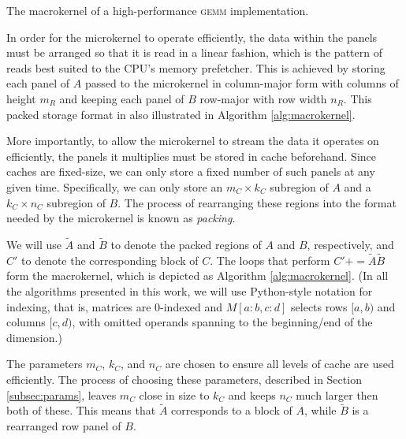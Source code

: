 \documentclass[12pt]{article}
\newcommand*{\TO}{\textbf{to}}
\newcommand*{\pluseq}{\mathrel{{+}{=}}}
\newcommand*{\gemm}{{\textsc{gemm}}}
\begin{document}
\begin{algorithm}
  \caption{The macrokernel of a high-performance \gemm{} implementation.}
  \label{alg:macrokernel}
  \begin{tikzpicture}
    
  \end{tikzpicture}
  \begin{algorithmic}
    \For{$j \gets 0, n_R, \ldots$ \TO{} $n_C$}
    \For{$i \gets 0, m_R, \ldots$ \TO{} $m_C$}
    \State{$C'[i:i + m_R, j:j + n_R] \pluseq \widetilde{A}[i:i+m_R,:] \cdot \widetilde{B}[:,j:j+n_R]$}
    \EndFor{}
    \EndFor{}
    \EndProcedure{}
  \end{algorithmic}
\end{algorithm}

In order for the microkernel to operate efficiently, the data within the panels must be arranged so that it is read in a linear fashion, which is the pattern of reads best suited to the CPU's memory prefetcher.
This is achieved by storing each panel of $A$ passed to the microkernel in column-major form with columns of height $m_R$ and keeping each panel of $B$ row-major with row width $n_R$.
This packed storage format in also illustrated in Algorithm \ref{alg:macrokernel}.

More importantly, to allow the microkernel to stream the data it operates on efficiently, the panels it multiplies must be stored in cache beforehand.
Since caches are fixed-size, we can only store a fixed number of such panels at any given time.
Specifically, we can only store an $m_C \times k_C$ subregion of $A$ and a $k_C \times n_C$ subregion of $B$.
The process of rearranging these regions into the format needed by the microkernel is known as \emph{packing}.

We will use $\widetilde{A}$ and $\widetilde{B}$ to denote the packed regions of $A$ and $B$, respectively, and $C'$ to denote the corresponding block of $C$.
The loops that perform $C' \pluseq \widetilde{A}\widetilde{B}$ form the macrokernel, which is depicted as Algorithm \ref{alg:macrokernel}.
(In all the algorithms presented in this work, we will use Python-style notation for indexing, that is, matrices are 0-indexed and   $M[a:b, c:d]$ selects rows $[a, b)$ and columns $[c, d)$, with omitted operands spanning to the beginning/end of the dimension.)

The parameters $m_C$, $k_C$, and $n_C$ are chosen to ensure all levels of cache are used efficiently.
The process of choosing these parameters, described in Section \ref{subsec:params}, leaves $m_C$ close in size to $k_C$ and keeps $n_C$ much larger then both of these.
This means that $\widetilde{A}$ corresponds to a block of $A$, while $\widetilde{B}$ is a rearranged row panel of $B$.
\end{document}
